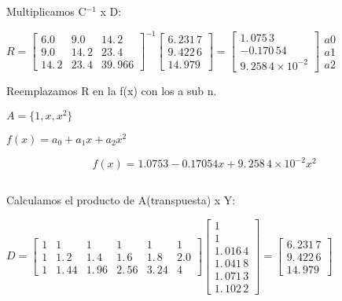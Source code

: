 \documentclass{article}
\begin{document}
\bigskip

Multiplicamos C$^{-1}$ x D:

\bigskip $R=\left[ 
\begin{array}{ccc}
6.0 & 9.0 & 14.\,\allowbreak 2 \\ 
9.0 & 14.\,\allowbreak 2 & 23.\,\allowbreak 4 \\ 
14.\,\allowbreak 2 & 23.\,\allowbreak 4 & 39.\,\allowbreak 966%
\end{array}%
\right] ^{-1}\left[ 
\begin{array}{c}
6.\,\allowbreak 231\,7 \\ 
9.\,\allowbreak 422\,6 \\ 
14.\,\allowbreak 979%
\end{array}%
\right] =\allowbreak \left[ 
\begin{array}{c}
1.\,\allowbreak 075\,3 \\ 
-0.170\,54 \\ 
9.\,\allowbreak 258\,4\times 10^{-2}%
\end{array}%
\right] \allowbreak 
\begin{array}{c}
a0 \\ 
a1 \\ 
a2%
\end{array}%
$

\bigskip Reemplazamos R en la f(x) con los a sub n.

$A=\{1,x,x^{2}\}$

$f(x)=a_{0}+a_{1}x+a_{2}x^{2}$

\[
f(x)=1.0753-0.17054x+9.\,\allowbreak 258\,4\times 10^{-2}x^{2}
\]

\bigskip

\bigskip

\bigskip

\bigskip

$\allowbreak $

\bigskip

Calculamos el producto de A(transpuesta) x Y:

$D=\left[ 
\begin{array}{cccccc}
1 & 1 & 1 & 1 & 1 & 1 \\ 
1 & 1.\,\allowbreak 2 & 1.\,\allowbreak 4 & 1.\,\allowbreak 6 & 
1.\,\allowbreak 8 & 2.0 \\ 
1 & 1.\,\allowbreak 44 & 1.\,\allowbreak 96 & 2.\,\allowbreak 56 & 
3.\,\allowbreak 24 & 4%
\end{array}%
\right] \left[ 
\begin{array}{c}
1 \\ 
1 \\ 
1.\,\allowbreak 016\,4 \\ 
1.\,\allowbreak 041\,8 \\ 
1.\,\allowbreak 071\,3 \\ 
1.\,\allowbreak 102\,2%
\end{array}%
\right] =\allowbreak \left[ 
\begin{array}{c}
6.\,\allowbreak 231\,7 \\ 
9.\,\allowbreak 422\,6 \\ 
14.\,\allowbreak 979%
\end{array}%
\right] $
\end{document}
